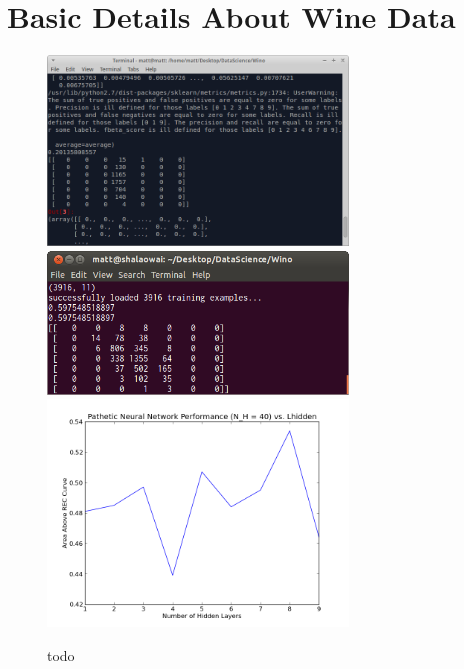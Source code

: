 \documentclass[11pt]{article}
\begin{document}
\section*{Basic Details About Wine Data}

\begin{figure}[h]
  \centering
  \includegraphics[width=8cm]{firstConfusion.png}
  \includegraphics[width=8cm]{ConfusionPostNormalization.png}
  \includegraphics[width=8cm]{VaryLhidden.png}
  \caption{todo}
  \label{fig:todo}
\end{figure}
\end{document}
